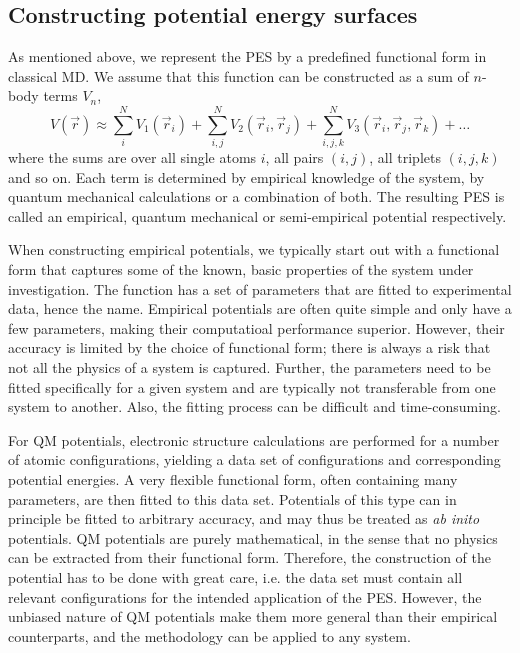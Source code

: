 \documentclass[twoside,english]{uiofysmaster}
\begin{document}
\subsection{Constructing potential energy surfaces} \label{sec:constructingPES}
As mentioned above, we represent the PES by a predefined functional form in classical MD. We assume that this
function can be constructed as a sum of $n$-body terms $V_n$,
\begin{equation}
 V(\vec{r}) \approx \sum_i^N V_1(\vec{r}_i) + \sum_{i,j}^N V_2(\vec{r}_i, \vec{r}_j) + 
 \sum_{i,j,k}^N V_3(\vec{r}_i, \vec{r}_j, \vec{r}_k) + \dots
 \label{generalPotential}
\end{equation}
where the sums are over all single atoms $i$, all pairs $(i,j)$, all triplets $(i,j,k)$ and so on. 
Each term is determined by empirical knowledge of the system, by quantum mechanical calculations or a combination of both. 
The resulting PES is called an empirical, quantum mechanical or semi-empirical potential respectively. 

When constructing empirical potentials, we typically start out with a functional form that captures some of the known, basic properties
of the system under investigation. The function has a set of parameters that are fitted to experimental data, hence the name.
Empirical potentials are often quite simple and only have a few parameters, making their computatioal performance superior. 
However, their
accuracy is limited by the choice of functional form; there is always a risk that not all the physics of a system
is captured. Further, the parameters need to be fitted specifically for a given system and are typically not transferable 
from one system to another. Also, the fitting process can be difficult and time-consuming. 

For QM potentials, electronic structure calculations are performed for a number of atomic configurations, yielding a data set
of configurations and corresponding potential energies. A very flexible functional form, often containing many parameters, 
are then fitted to this data set. Potentials of this type can in principle be fitted to arbitrary accuracy, and may thus 
be treated as \textit{ab inito} potentials. QM potentials are purely mathematical,
in the sense that no physics can be extracted from their functional form. Therefore, the construction of the potential
has to be done with great care, i.e. the data set must contain all relevant configurations for the intended application
of the PES. However, the unbiased nature of QM potentials make them more general than their empirical counterparts,
and the methodology can be applied to any system. 
\end{document}
